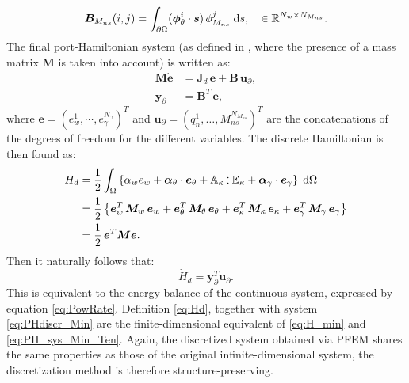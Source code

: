 \documentclass[11t]{article}
\def\onedot{$\mathsurround0pt\ldotp$}
\def\cddot{%
	\mathbin{\vcenter{\baselineskip.67ex
			\hbox{\onedot}\hbox{\onedot}}%
}}
\begin{document}
{\begin{equation}
\begin{aligned}
		\bm{B}_{M_{ns}}(i,j) &= \int_{\partial\Omega} (\bm{\phi}_{\theta}^i \cdot \bm{s})\, \phi_{M_{ns}}^j \d{s}, \quad \in \mathbb{R}^{N_w \times N_{M_{ns}}}. \\
		\end{aligned}
		\end{equation}
		The final port-Hamiltonian system (as defined in \cite{beattie2018linear}, where the presence of a mass matrix $\bm{M}$ is taken into account) is written as:
		\begin{equation}
		\label{eq:PHdiscr_Min}
		\begin{aligned}
		\bm{M} \dot{\bm{e}} &= \bm{J}_d  \,\bm{e} + \bm{B} \, \bm{u}_{\partial}, \\
		\bm{y}_{\partial} &= \bm{B}^T \, \bm{e},
		\end{aligned} 
		\end{equation}
		where $\bm{e} = \left(e_w^1, \cdots, e_{\gamma}^{N_{\gamma}}\right)^T$ and $\bm{u}_{\partial} = \left(q_n^1, \dots, M_{ns}^{N_{M_{ns}}}\right)^T$ are the concatenations of the degrees of freedom for the different variables. The discrete Hamiltonian is then found as:
		\begin{equation}
		\label{eq:Hd}
		\begin{aligned}
		H_d &= \frac{1}{2} \int_{\Omega} \left\{ \alpha_w e_w + \bm{\alpha}_\theta \cdot \bm{e}_{\theta} + \mathbb{A}_{\kappa} \cddot \mathbb{E}_\kappa + \bm\alpha_{\gamma} \cdot \bm{e}_{\gamma}  \right\} \d\Omega \\
		&=  \frac{1}{2}  \left\{ \bm{e}_w^T \, \bm{M}_w \, \bm{e}_w + \bm{e}_\theta^T \, \bm{M}_\theta \, \bm{e}_\theta + \bm{e}_\kappa^T \, \bm{M}_\kappa \, \bm{e}_\kappa + \bm{e}_{\gamma}^T \, \bm{M}_{\gamma} \, \bm{e}_{\gamma}  \right\} \\
		&=  \frac{1}{2} \, \bm{e}^T  \bm{M}  \bm{e}.
		\end{aligned}
		\end{equation}
	}
	Then it naturally follows that:
	\begin{equation}
	\dot{H}_d = \bm{y}_{\partial}^T \bm{u}_{\partial}.
	\end{equation}
	This is equivalent to the energy balance of the continuous system, expressed by equation \eqref{eq:PowRate}. Definition \eqref{eq:Hd}, together with system \eqref{eq:PHdiscr_Min} are the finite-dimensional equivalent of \eqref{eq:H_min} and  \eqref{eq:PH_sys_Min_Ten}. Again, the discretized system obtained via PFEM shares the same properties as those of the original infinite-dimensional system, the discretization method is therefore structure-preserving. \\
	
\end{document}
